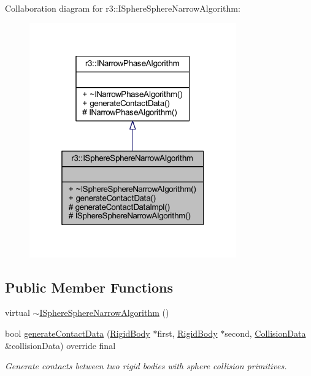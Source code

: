 Collaboration diagram for r3\+:\+:I\+Sphere\+Sphere\+Narrow\+Algorithm\+:\nopagebreak
\begin{figure}[H]
\begin{center}
\leavevmode
\includegraphics[width=253pt]{classr3_1_1_i_sphere_sphere_narrow_algorithm__coll__graph}
\end{center}
\end{figure}
\subsection*{Public Member Functions}
\begin{DoxyCompactItemize}
\item 
virtual \mbox{\hyperlink{classr3_1_1_i_sphere_sphere_narrow_algorithm_af1abc65f80b07e3af1d3b1c69d6b5db0}{$\sim$\+I\+Sphere\+Sphere\+Narrow\+Algorithm}} ()
\item 
bool \mbox{\hyperlink{classr3_1_1_i_sphere_sphere_narrow_algorithm_acfdb8ae3db8c91843216651768cbd4e2}{generate\+Contact\+Data}} (\mbox{\hyperlink{classr3_1_1_rigid_body}{Rigid\+Body}} $\ast$first, \mbox{\hyperlink{classr3_1_1_rigid_body}{Rigid\+Body}} $\ast$second, \mbox{\hyperlink{classr3_1_1_collision_data}{Collision\+Data}} \&collision\+Data) override final
\begin{DoxyCompactList}\small\item\em Generate contacts between two rigid bodies with sphere collision primitives. \end{DoxyCompactList}\end{DoxyCompactItemize}
